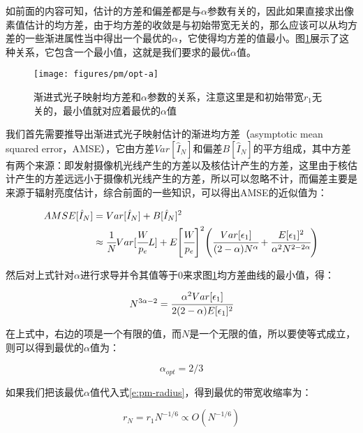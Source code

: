 如前面的内容可知，估计的方差和偏差都是与$\alpha$参数有关的，因此如果直接求出像素值估计的均方差，由于均方差的收敛是与初始带宽无关的，那么应该可以从均方差的一些渐进属性当中得出一个最优的$\alpha$，它使得均方差的值最小。图\ref{f:pm-opt-a}展示了这种关系，它包含一个最小值，这就是我们要求的最优$\alpha$值。

\begin{figure}
	\sidecaption
	\texttt{[image: figures/pm/opt-a]}
	\caption{渐进式光子映射均方差和$\alpha$参数的关系，注意这里是和初始带宽$r_1$无关的，最小值就对应着最优的$\alpha$值}
	\label{f:pm-opt-a}
\end{figure}

我们首先需要推导出渐进式光子映射估计的渐进均方差（asymptotic mean squared error，AMSE），它由方差$Var[\hat{I}_N]$和偏差$B[\hat{I}_N]$的平方组成，其中方差有两个来源：即发射摄像机光线产生的方差以及核估计产生的方差，这里由于核估计产生的方差远远小于摄像机光线产生的方差，所以可以忽略不计，而偏差主要是来源于辐射亮度估计，综合前面的一些知识，可以得出AMSE的近似值为：

\begin{equation}\label{e:pm-mse}
\begin{aligned}
	AMSE[\hat{I}_N]&=Var[\hat{I}_N]+B[\hat{I}_N]^{2}\\
	&\approx \cfrac{1}{N}Var[ \cfrac{W}{p_e}L]+E\Biggl[ \cfrac{W}{p_e}\Biggl]^{2}\Biggl( \cfrac{Var[\epsilon_1]}{(2-\alpha)N^{\alpha}}+ \cfrac{E[\epsilon_1]^{2}}{\alpha^{2}N^{2-2\alpha}}\Biggl)
\end{aligned}
\end{equation}

然后对上式针对$\alpha$进行求导并令其值等于0来求图\ref{f:pm-opt-a}均方差曲线的最小值，得：

\begin{equation}
	N^{3\alpha-2}= \cfrac{\alpha^{2}Var[\epsilon_1]}{2(2-\alpha)E[\epsilon_1]^{2}}
\end{equation}

在上式中，右边的项是一个有限的值，而$N$是一个无限的值，所以要使等式成立，则可以得到最优的$\alpha$值为：

\begin{equation}
	\alpha_{opt}=2/3
\end{equation}

如果我们把该最优$\alpha$值代入式\ref{e:pm-radius}，得到最优的带宽收缩率为：

\begin{equation}
	r_N=r_1N^{-1/6}\propto O(N^{-1/6})
\end{equation}

